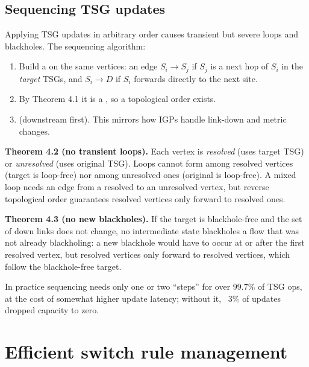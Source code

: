 \subsection{Sequencing TSG updates}
Applying TSG updates in arbitrary order causes transient but severe loops and blackholes. The sequencing algorithm:
\begin{enumerate}
\item Build a  on the same vertices: an edge $S_i\to S_j$ if $S_j$ is a next hop of $S_i$ in the \emph{target} TSGs, and $S_i\to D$ if $S_i$ forwards directly to the next site.
\item By Theorem 4.1 it is a , so a topological order exists.
\item {} (downstream first). This mirrors how IGPs handle link-down and metric changes.
\end{enumerate}
\textbf{Theorem 4.2 (no transient loops).} Each vertex is \emph{resolved} (uses target TSG) or \emph{unresolved} (uses original TSG). Loops cannot form among resolved vertices (target is loop-free) nor among unresolved ones (original is loop-free). A mixed loop needs an edge from a resolved to an unresolved vertex, but reverse topological order guarantees resolved vertices only forward to resolved ones.

\textbf{Theorem 4.3 (no new blackholes).} If the target is blackhole-free and the set of down links does not change, no intermediate state blackholes a flow that was not already blackholing: a new blackhole would have to occur at or after the first resolved vertex, but resolved vertices only forward to resolved vertices, which follow the blackhole-free target.

In practice sequencing needs only one or two ``steps'' for over 99.7\% of TSG ops, at the cost of somewhat higher update latency; without it, ~3\% of updates dropped capacity to zero.

\section{Efficient switch rule management}
